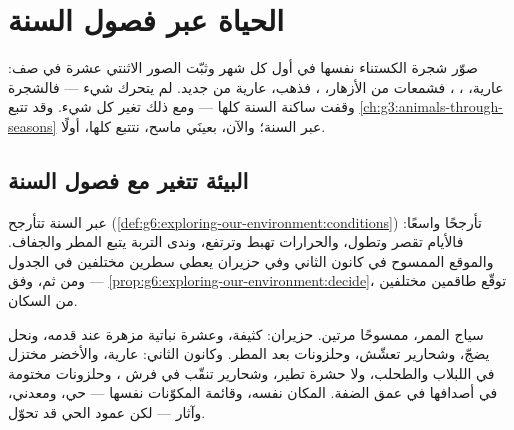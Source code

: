 \chapter{الحياة عبر فصول السنة}\label{ch:g6:life-through-seasons}

صوّر شجرة الكستناء نفسها في أول كل شهر وثبّت الصور الاثنتي عشرة في
صف:  عارية، ، ، فشمعات من الأزهار، ، فذهب،
 عارية من جديد. لم يتحرك شيء --- فالشجرة وقفت ساكنة السنة
كلها --- ومع ذلك تغير كل شيء. وقد تتبع
\cref{ch:g3:animals-through-seasons}  عبر السنة؛ والآن،
بعينَي ماسح، نتتبع  كلها،  أولًا.

\section{البيئة تتغير مع فصول السنة}

\begin{proposition}\label{prop:g6:life-through-seasons:conditions}
عبر السنة تتأرجح  
(\cref{def:g6:exploring-our-environment:conditions}) تأرجحًا
واسعًا: فالأيام تقصر وتطول، والحرارات تهبط وترتفع، وندى التربة
يتبع المطر والجفاف. والموقع الممسوح في كانون الثاني وفي حزيران
يعطي سطرين مختلفين في الجدول --- ومن ثم، وفق
\cref{prop:g6:exploring-our-environment:decide}، توقّع طاقمين
مختلفين من السكان.
\end{proposition}
\admitted

\begin{example}\label{ex:g6:life-through-seasons:hedge}
سياج الممر، ممسوحًا مرتين. حزيران:  كثيفة، وعشرة  نباتية
مزهرة عند قدمه، ونحل يضجّ، وشحارير تعشّش، وحلزونات بعد المطر.
وكانون الثاني:  عارية، والأخضر مختزل في اللبلاب والطحلب، ولا
حشرة تطير، وشحارير تنقّب في فرش ، وحلزونات مختومة في
أصدافها في عمق الضفة. المكان نفسه، وقائمة المكوّنات نفسها ---
حي، ومعدني، وآثار --- لكن عمود الحي قد تحوّل.
\end{example}

